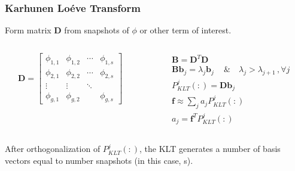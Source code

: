 \documentclass[fleqn]{beamer}
\begin{document}
  
  \begin{frame}
      \frametitle{Karhunen Lo\'{e}ve Transform}
      \begin{block}{}
      Form matrix $\mathbf{D}$ from snapshots of $\phi$ or other term of 
      interest.
  \end{block}
      \begin{columns}[c]
          \begin{column}{0.5\textwidth}
              \begin{equation*}
              \mathbf{D} = \begin{bmatrix}
                  \phi_{1,1} & \phi_{1,2} & \cdots & \phi_{1,s} \\
                  \phi_{2,1} & \phi_{2,2} & \cdots & \phi_{2,s} \\
                  \vdots & \vdots & \ddots \\
                  \phi_{g,1} & \phi_{g,2} & & \phi_{g,s}
              \end{bmatrix}
          \end{equation*}
          \end{column}
          \begin{column}{0.5\textwidth}
              \setlength{\mathindent}{0pt}
              \begin{equation*}
                  \begin{split}
                      &\mathbf{B} = \mathbf{D}^{T}\mathbf{D} \\
                      &\mathbf{Bb}_j = \lambda_j \mathbf{b}_j \,  \quad \& \quad 
                      \lambda_j > \lambda_{j+1} \, , \forall j \\
                      &P^j_{KLT}(:) = \mathbf{D}\mathbf{b}_j \\
                      & \mathbf{f} \approx \sum_j a_j P^j_{KLT}(:) \\
                      &a_j 
                      = 
                      \mathbf{f}^T P^j_{KLT}(:)
                  \end{split}
              \end{equation*}
          \end{column}
      \end{columns}
      \begin{block}{}
      After orthogonalization of $P^j_{KLT}(:)$, the KLT generates a 
      number of basis vectors equal to number snapshots (in this case, s).
      \end{block}
  \end{frame}
  
\end{document}
